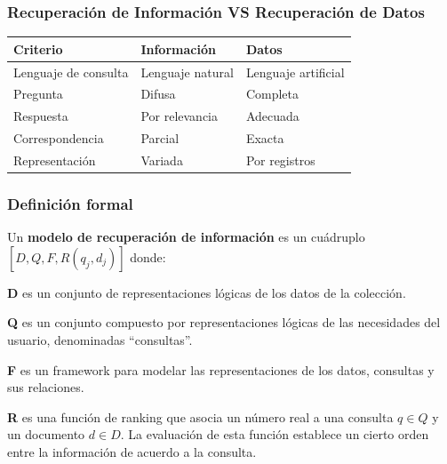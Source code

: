 \documentclass[
	10pt, %
	aspectratio=169, %
]{beamer}
\begin{document}
\begin{frame}[fragile]
	
	\frametitle{Recuperación de Información VS Recuperación de Datos}
	
	\begin{table}[]
		\begin{tabular}{l|l|l}
			\hline
			Criterio             & Información      & Datos               \\
			\hline
			\hline
			Lenguaje de consulta & Lenguaje natural & Lenguaje artificial \\
			\hline
			Pregunta             & Difusa           & Completa            \\
			\hline
			Respuesta            & Por relevancia   & Adecuada            \\
			\hline
			Correspondencia      & Parcial          & Exacta              \\
			\hline
			Representación       & Variada          & Por registros      \\
			\hline
		\end{tabular}
	\end{table}
	
\end{frame}


\begin{frame}[fragile]
	
	\frametitle{Definición formal}
	
	\begin{alertblock}{} 
		Un \textbf{modelo de recuperación de información} es un cuádruplo $[D, Q, F, R(q_j, d_j)]$ donde:  
		
		\vspace{1\baselineskip}
		\textbf{D} es un conjunto de representaciones lógicas de los datos de la colección.
		
		\vspace{1\baselineskip}
		\textbf{Q} es un conjunto compuesto por representaciones lógicas de las necesidades del usuario, denominadas ``consultas''.
		
		\vspace{1\baselineskip}
		\textbf{F} es un framework para modelar las representaciones de los datos, consultas y sus relaciones.
		
		\vspace{1\baselineskip}
		\textbf{R} es una función de ranking que asocia un número real a una consulta $q \in Q$ y un documento $d \in D$. La evaluación de esta función establece un cierto orden entre la información de acuerdo a la consulta.
	
	\end{alertblock}
	
\end{frame}
\end{document}
